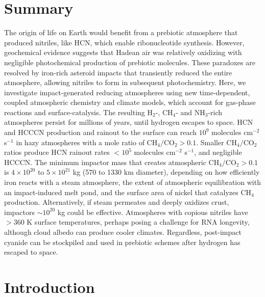 
\section*{\centering Summary}

The origin of life on Earth would benefit from a prebiotic atmosphere that produced nitriles, like HCN, which enable ribonucleotide synthesis. However, geochemical evidence suggests that Hadean air was relatively oxidizing with negligible photochemical production of prebiotic molecules. These paradoxes are resolved by iron-rich asteroid impacts that transiently reduced the entire atmosphere, allowing nitriles to form in subsequent photochemistry. Here, we investigate impact-generated reducing atmospheres using new time-dependent, coupled atmospheric chemistry and climate models, which account for gas-phase reactions and surface-catalysis. The resulting H$_2$-, CH$_4$- and NH$_3$-rich atmospheres persist for millions of years, until hydrogen escapes to space. HCN and HCCCN production and rainout to the surface can reach $10^9$ molecules cm$^{-2}$ s$^{-1}$ in hazy atmospheres with a mole ratio of $\mathrm{CH_4} / \mathrm{CO_2} > 0.1$. Smaller $\mathrm{CH_4} / \mathrm{CO_2}$ ratios produce HCN rainout rates $< 10^5$ molecules cm$^{-2}$ s$^{-1}$, and negligible HCCCN. The minimum impactor mass that creates atmospheric $\mathrm{CH_4} / \mathrm{CO_2} > 0.1$ is $4 \times 10^{20}$ to $5 \times 10^{21}$ kg (570 to 1330 km diameter), depending on how efficiently iron reacts with a steam atmosphere, the extent of atmospheric equilibration with an impact-induced melt pond, and the surface area of nickel that catalyzes CH$_4$ production. Alternatively, if steam permeates and deeply oxidizes crust, impactors $\sim 10^{20}$ kg could be effective. Atmospheres with copious nitriles have $> 360$ K surface temperatures, perhaps posing a challenge for RNA longevity, although cloud albedo can produce cooler climates. Regardless, post-impact cyanide can be stockpiled and used in prebiotic schemes after hydrogen has escaped to space.

\section{Introduction}

